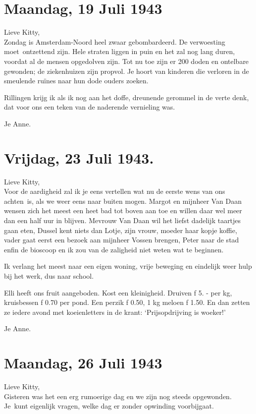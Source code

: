 \documentclass{book}
\begin{document}
\section*{Maandag, 19 Juli 1943}

Lieve Kitty,\\
Zondag is Amsterdam-Noord heel zwaar gebombardeerd. De
verwoesting moet~ontzettend zijn. Hele straten liggen in puin en het zal nog
lang duren, voordat al de mensen opgedolven zijn. Tot nu toe zijn er 200 doden
en ontelbare gewonden; de ziekenhuizen zijn propvol. Je hoort van kinderen die
verloren in de smeulende ruïnes naar hun dode ouders zoeken.

Rillingen krijg ik als ik nog aan het doffe, dreunende gerommel in de verte
denk, dat voor ons een teken van de naderende vernieling was.

Je Anne.

\section*{Vrijdag, 23 Juli 1943.}

Lieve Kitty,\\
Voor de aardigheid zal ik je eens vertellen wat nu de eerste wens
van ons achten~is, als we weer eens naar buiten mogen.  Margot en mijnheer Van
Daan wensen zich het meest een heet bad tot boven aan toe en willen daar wel
meer dan een half uur in blijven. Mevrouw Van Daan wil het liefst dadelijk
taartjes gaan eten, Dussel kent niets dan Lotje, zijn vrouw, moeder haar kopje
koffie, vader gaat eerst een bezoek aan mijnheer Vossen brengen, Peter naar de
stad enfin de bioscoop en ik zou van de zaligheid niet weten wat te beginnen.

Ik verlang het meest naar een eigen woning, vrije beweging en eindelijk weer
hulp bij het werk, dus naar school.

Elli heeft ons fruit aangeboden. Kost een kleinigheid. Druiven ƒ 5. - per kg,
kruisbessen ƒ 0.70 per pond. Een perzik ƒ 0.50, 1 kg meloen ƒ 1.50. En dan
zetten ze iedere avond met koeienletters in de krant: `Prijsopdrijving is
woeker!'

Je Anne.

\section*{Maandag, 26 Juli 1943}

Lieve Kitty,\\
Gisteren was het een erg rumoerige dag en we zijn nog steeds
opgewonden. Je~kunt eigenlijk vragen, welke dag er zonder opwinding voorbijgaat.
\end{document}
